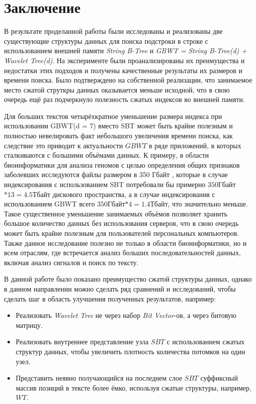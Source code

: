 \documentclass[a4paper,12pt]{article}
\begin{document}
\section{Заключение}

В результате проделанной работы были исследованы и реализованы две существующие структуры данных для поиска подстроки в строке с использованием внешней памяти \textit{String B-Tree} и \textit{GBWT = String B-Tree(d) + Wavelet Tree(d)}. На эксперименте были проанализированы их преимущества и недостатки этих подходов и получены качественные результаты их размеров и времени поиска. Было подтверждено на собственной реализации, что занимаемое место сжатой струткры данных оказывается меньше исходной, что в свою очередь ещё раз подчеркнуло полезность сжатых индексов во внешней памяти.

Для больших текстов четырёхкратное уменьшение размера индекса при использовании GBWT(d = 7) вместо SBT может быть крайне полезным и полностью невелировать факт небольшого увеличения времени поиска, как следствие это приводит к актуальности $GBWT$ в ряде приложений, в которых сталкиваются с большими объёмами данных. К примеру, в области биоинформатики для анализа геномов с целью определения общих признаков заболевших исследуются файлы размером в 350 Гбайт \cite{1000HumanGenom}, которые в случае индексирования с использованием SBT потребовали бы примерно $350$Гбайт$ * 13 = 4.5$Тбайт дискового пространства, а в случае индексирования с использованием GBWT всего $350$Гбайт$ * 4 = 1.4$Тбайт, что значительно меньше. Такое существенное уменьшение занимаемых объёмов позволяет хранить большое количество данных без использования серверов, что в свою очередь может быть крайне полезным для пользователей персональных компьютеров. Также данное исследование полезно не только в области биоинформатики, но и всем отраслям, где встречается анализ больших последовательностей данных, включая анализ сигналов и поиск по тексту.

В данной работе было показано преимущество сжатой структуры данных, однако в данном направлении можно сделать ряд сравнений и исследований, чтобы сделать шаг в область улучшения полученных результатов, например:
\begin{itemize}
    \item Реализовать \textit{Wavelet Tree} не через набор \textit{Bit Vector}-ов, а через битовую матрицу.
    \item Реализовать внутреннее представление узла $SBT$ с использованием сжатых структур данных, чтобы увеличить плотность количества потомков на один узел.
    \item Представить неявно получающийся на последнем слое $SBT$ суффиксный массив позиций в тексте более ёмко, используя сжатые структуры, например, $WT$.
\end{itemize}
\end{document}
